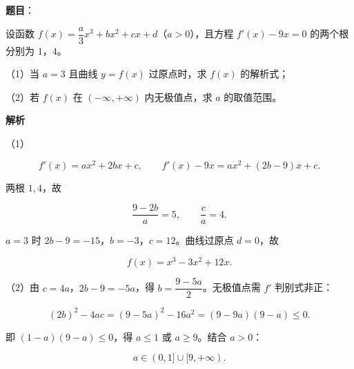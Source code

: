 \begin{answer}

\textbf{题目}：

设函数 $f(x)=\dfrac a3x^3+bx^2+cx+d$（$a>0$），且方程 $f'(x)-9x=0$ 的两个根分别为 $1$，$4$。

（1）当 $a=3$ 且曲线 $y=f(x)$ 过原点时，求 $f(x)$ 的解析式；

（2）若 $f(x)$ 在 $(-\infty,+\infty)$ 内无极值点，求 $a$ 的取值范围。

\textbf{解析}

（1）

\nopagebreak[4]
\[f'(x)=ax^2+2bx+c,\qquad f'(x)-9x=ax^2+(2b-9)x+c.\]

两根 $1,4$，故

\nopagebreak[4]
\[\frac{9-2b}{a}=5,\qquad \frac ca=4.\]

$a=3$ 时 $2b-9=-15$，$b=-3$，$c=12$。曲线过原点 $d=0$，故

\nopagebreak[4]
\[f(x)=x^3-3x^2+12x.\]

（2）由 $c=4a$，$2b-9=-5a$，得 $b=\dfrac{9-5a}2$。无极值点需 $f'$ 判别式非正：

\nopagebreak[4]
\[(2b)^2-4ac=(9-5a)^2-16a^2
=(9-9a)(9-a)\leqslant0.\]

即 $(1-a)(9-a)\leqslant0$，得 $a\leqslant1$ 或 $a\geqslant9$。结合 $a>0$：

\nopagebreak[4]
\[a\in(0,1]\cup[9,+\infty).\]

\gkanswer{答案：（1）$f(x)=x^3-3x^2+12x$；（2）$(0,1]\cup[9,+\infty)$。}

\end{answer}
